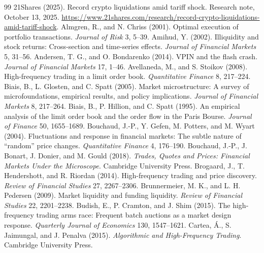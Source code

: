 \begin{thebibliography}{99}\setlength{\itemsep}{2pt}\small
{} 21Shares (2025). Record crypto liquidations amid tariff shock. Research note, October 13, 2025. \url{https://www.21shares.com/research/record-crypto-liquidations-amid-tariff-shock}.
 Almgren, R., and N. Chriss (2001). Optimal execution of portfolio transactions. \emph{Journal of Risk} 3, 5--39.
 Amihud, Y. (2002). Illiquidity and stock returns: Cross-section and time-series effects. \emph{Journal of Financial Markets} 5, 31--56.
 Andersen, T. G., and O. Bondarenko (2014). VPIN and the flash crash. \emph{Journal of Financial Markets} 17, 1--46.
 Avellaneda, M., and S. Stoikov (2008). High-frequency trading in a limit order book. \emph{Quantitative Finance} 8, 217--224.
 Biais, B., L. Glosten, and C. Spatt (2005). Market microstructure: A survey of microfoundations, empirical results, and policy implications. \emph{Journal of Financial Markets} 8, 217--264.
 Biais, B., P. Hillion, and C. Spatt (1995). An empirical analysis of the limit order book and the order flow in the Paris Bourse. \emph{Journal of Finance} 50, 1655--1689.
 Bouchaud, J.-P., Y. Gefen, M. Potters, and M. Wyart (2004). Fluctuations and response in financial markets: The subtle nature of ``random'' price changes. \emph{Quantitative Finance} 4, 176--190.
 Bouchaud, J.-P., J. Bonart, J. Donier, and M. Gould (2018). \emph{Trades, Quotes and Prices: Financial Markets Under the Microscope}. Cambridge University Press.
 Brogaard, J., T. Hendershott, and R. Riordan (2014). High-frequency trading and price discovery. \emph{Review of Financial Studies} 27, 2267--2306.
 Brunnermeier, M. K., and L. H. Pedersen (2009). Market liquidity and funding liquidity. \emph{Review of Financial Studies} 22, 2201--2238.
 Budish, E., P. Cramton, and J. Shim (2015). The high-frequency trading arms race: Frequent batch auctions as a market design response. \emph{Quarterly Journal of Economics} 130, 1547--1621.
 Cartea, \'A., S. Jaimungal, and J. Penalva (2015). \emph{Algorithmic and High-Frequency Trading}. Cambridge University Press.

\end{thebibliography}
